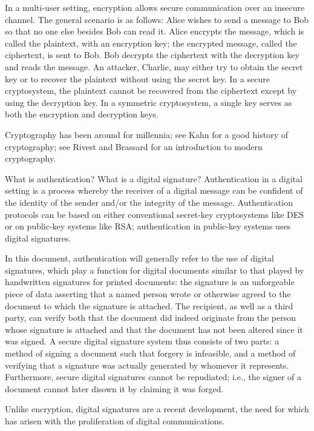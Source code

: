 In a multi-user setting, encryption allows secure communication over an
insecure channel. The general scenario is as follows: Alice wishes to 
send a message to Bob so that no one else besides Bob can read it. Alice 
encrypts the message, which is called the plaintext, with an encryption 
key; the encrypted message, called the ciphertext, is sent to Bob. Bob 
decrypts the ciphertext with the decryption key and reads the message. An 
attacker, Charlie, may either try to obtain the secret key or to recover 
the plaintext without using the secret key. In a secure cryptosystem, the 
plaintext cannot be recovered from the ciphertext except by using the 
decryption key. In a symmetric cryptosystem, a single key serves as both 
the encryption and decryption keys.

Cryptography has been around for millennia; see Kahn \cite{kahn} for a 
good history of cryptography; see Rivest \cite{rivest-survey} and Brassard
\cite{brassard} for an introduction to modern cryptography.

{What is authentication? What is a digital signature?}
Authentication in a digital setting is a process whereby the receiver of a 
digital message can be confident of the identity of the sender and/or the
integrity of the message. Authentication protocols can be based on either 
conventional secret-key cryptosystems like DES or on public-key systems 
like RSA; authentication in public-key systems uses digital signatures.

In this document, authentication will generally refer to the use of digital
signatures, which play a function for digital documents similar to that 
played by handwritten signatures for printed documents: the signature is an 
unforgeable piece of data asserting that a named person wrote or otherwise 
agreed to the document to which the signature is attached. The recipient, as 
well as a third party, can verify both that the document did indeed originate 
from the person whose signature is attached and that the document has not 
been altered since it was signed. A secure digital signature system thus 
consists of two parts: a method of signing a document such that forgery is 
infeasible, and a method of verifying that a signature was actually generated 
by whomever it represents. Furthermore, secure digital signatures cannot be 
repudiated; i.e., the signer of a document cannot later disown it by claiming 
it was forged.

Unlike encryption, digital signatures are a recent development, the
need for which has arisen with the proliferation of digital communications.


